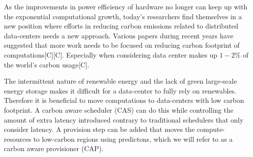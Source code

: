 As the improvements in power efficiency of hardware no longer can keep up with the exponential computational growth, today's researchers find themselves in a new position where efforts in reducing carbon emissions related to distributed data-centers needs a new approach. Various papers during recent years have suggested that more work needs to be focused on reducing carbon footprint of computations[C][C]. Especially when considering data center makes up $1-2\%$ of the world's carbon usage[C].  





The intermittent nature of renewable energy and the lack of green large-scale energy storage makes it difficult for a data-center to fully rely on renewables. Therefore it is beneficial to move computations to data-centers with low carbon footprint.
A carbon aware scheduler (CAS) can do this while controlling the amount of extra latency introduced contrary to traditional schedulers that only consider latency. 
A provision step can be added that moves the compute-resources to low-carbon regions using predictons, which we will refer to as a carbon aware provisioner (CAP).




